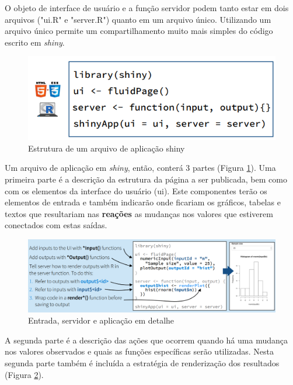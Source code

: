 \documentclass[12pt,a4paper,oneside]{erdc}
\begin{document}
O objeto de interface de usuário e a função servidor podem tanto estar em dois arquivos ("ui.R" e "server.R") quanto em um arquivo único. Utilizando um arquivo único permite um compartilhamento muito mais simples do código escrito em \textit{shiny}.


\begin{figure}[htpb]
	\centering
	\includegraphics[width=\linewidth]{../figs/BP_Curso_TecComp_00_2019_f06-09}
	\caption{Estrutura de um arquivo de aplicação shiny}
	\label{fig:bpcursoteccomp002019f06-09}
\end{figure}

Um arquivo de aplicação em \textit{shiny}, então, conterá 3 partes (Figura \ref{fig:bpcursoteccomp002019f06-09}). Uma primeira parte é a descrição  da estrutura da página a ser publicada, bem como com os elementos da interface do usuário (ui). Este componentes terão os elementos de entrada e também indicarão onde ficariam os gráficos, tabelas e textos que resultariam nas \textbf{reações} as mudanças nos valores que estiverem conectados com estas saídas. 

\begin{figure}[htpb]
	\centering
	\includegraphics[width=\linewidth]{../figs/BP_Curso_TecComp_00_2019_f06-10}
	\caption{Entrada, servidor e aplicação em detalhe}
	\label{fig:bpcursoteccomp002019f06-10}
\end{figure}


A segunda parte é a descrição das ações que ocorrem quando há uma mudança nos valores observados e quais as funções específicas serão utilizadas. Nesta segunda parte também é incluída a estratégia de renderização dos resultados (Figura \ref{fig:bpcursoteccomp002019f06-10}).
\end{document}

